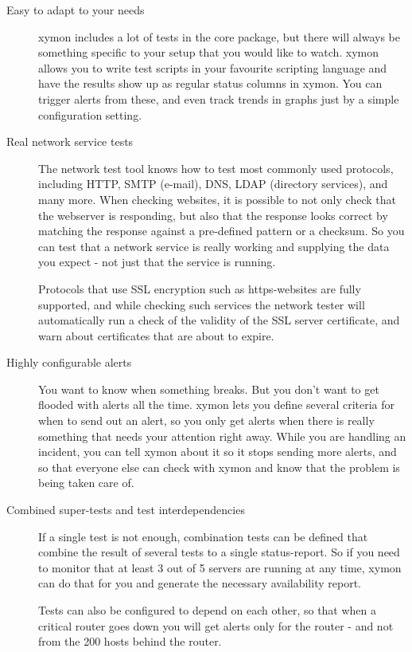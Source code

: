 \begin{description}
\item[Easy to adapt to your needs] xymon includes a lot of tests in
  the core package, but there will always be something specific to
  your setup that you would like to watch. xymon allows you to write
  test scripts in your favourite scripting language and have the
  results show up as regular status columns in xymon. You can trigger
  alerts from these, and even track trends in graphs just by a simple
  configuration setting. 


\item[Real network service tests] The network test tool knows how to
  test most commonly used protocols, including HTTP, SMTP (e-mail),
  DNS, LDAP (directory services), and many more. When checking
  websites, it is possible to not only check that the webserver is
  responding, but also that the response looks correct by matching the
  response against a pre-defined pattern or a checksum. So you can
  test that a network service is really working and supplying the data
  you expect - not just that the service is running. 

  Protocols that use SSL encryption such as https-websites are fully
  supported, and while checking such services the network tester will
  automatically run a check of the validity of the SSL server
  certificate, and warn about certificates that are about to expire. 

\item[Highly configurable alerts] You want to know when something
  breaks. But you don't want to get flooded with alerts all the
  time. xymon lets you define several criteria for when to send out
  an alert, so you only get alerts when there is really something that
  needs your attention right away. While you are handling an incident,
  you can tell xymon about it so it stops sending more alerts, and so
  that everyone else can check with xymon and know that the problem
  is being taken care of. 


\item[Combined super-tests and test interdependencies] If a single
  test is not enough, combination tests can be defined that combine
  the result of several tests to a single status-report. So if you
  need to monitor that at least 3 out of 5 servers are running at any
  time, xymon can do that for you and generate the necessary
  availability report. 

  Tests can also be configured to depend on each other, so that when a
  critical router goes down you will get alerts only for the router -
  and not from the 200 hosts behind the router. 

 
\end{description}

